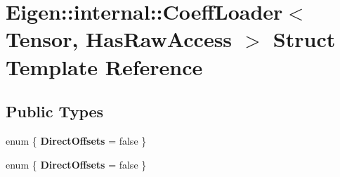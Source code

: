 \hypertarget{struct_eigen_1_1internal_1_1_coeff_loader}{}\section{Eigen\+:\+:internal\+:\+:Coeff\+Loader$<$ Tensor, Has\+Raw\+Access $>$ Struct Template Reference}
\label{struct_eigen_1_1internal_1_1_coeff_loader}
\subsection*{Public Types}
\begin{DoxyCompactItemize}
\item 
\mbox{\label{struct_eigen_1_1internal_1_1_coeff_loader_a5bc6ef1776278ce4f2fc19d35116c13d}} 
enum \{ {\bfseries Direct\+Offsets} = false
 \}
\item 
\mbox{\label{struct_eigen_1_1internal_1_1_coeff_loader_a5ea82aa874a79f58ed3c45534c13ae78}} 
enum \{ {\bfseries Direct\+Offsets} = false
 \}
\end{DoxyCompactItemize}
